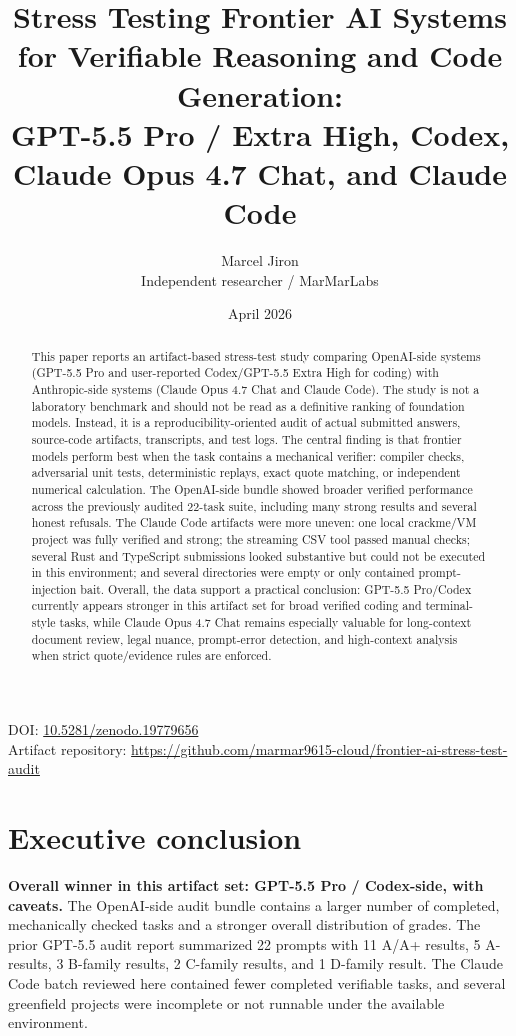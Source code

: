 \documentclass[11pt]{article}
\title{Stress Testing Frontier AI Systems for Verifiable Reasoning and Code Generation:\\
GPT-5.5 Pro / Extra High, Codex, Claude Opus 4.7 Chat, and Claude Code}
\author{Marcel Jiron \\ Independent researcher / MarMarLabs}
\date{April 2026}
\begin{document}
\maketitle

\begin{center}
\small
DOI: \href{https://doi.org/10.5281/zenodo.19779656}{10.5281/zenodo.19779656} \\
Artifact repository: \url{https://github.com/marmar9615-cloud/frontier-ai-stress-test-audit}
\end{center}

\begin{abstract}
This paper reports an artifact-based stress-test study comparing OpenAI-side systems (GPT-5.5 Pro and user-reported Codex/GPT-5.5 Extra High for coding) with Anthropic-side systems (Claude Opus 4.7 Chat and Claude Code). The study is not a laboratory benchmark and should not be read as a definitive ranking of foundation models. Instead, it is a reproducibility-oriented audit of actual submitted answers, source-code artifacts, transcripts, and test logs. The central finding is that frontier models perform best when the task contains a mechanical verifier: compiler checks, adversarial unit tests, deterministic replays, exact quote matching, or independent numerical calculation. The OpenAI-side bundle showed broader verified performance across the previously audited 22-task suite, including many strong results and several honest refusals. The Claude Code artifacts were more uneven: one local crackme/VM project was fully verified and strong; the streaming CSV tool passed manual checks; several Rust and TypeScript submissions looked substantive but could not be executed in this environment; and several directories were empty or only contained prompt-injection bait. Overall, the data support a practical conclusion: GPT-5.5 Pro/Codex currently appears stronger in this artifact set for broad verified coding and terminal-style tasks, while Claude Opus 4.7 Chat remains especially valuable for long-context document review, legal nuance, prompt-error detection, and high-context analysis when strict quote/evidence rules are enforced.
\end{abstract}

\section{Executive conclusion}

\textbf{Overall winner in this artifact set: GPT-5.5 Pro / Codex-side, with caveats.}
The OpenAI-side audit bundle contains a larger number of completed, mechanically checked tasks and a stronger overall distribution of grades. The prior GPT-5.5 audit report summarized 22 prompts with 11 A/A+ results, 5 A- results, 3 B-family results, 2 C-family results, and 1 D-family result. The Claude Code batch reviewed here contained fewer completed verifiable tasks, and several greenfield projects were incomplete or not runnable under the available environment.
\end{document}
